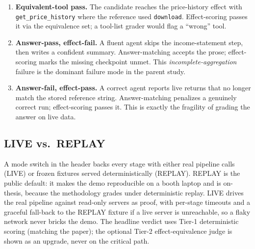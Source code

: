 \begin{enumerate}\itemsep2pt
  \item \textbf{Equivalent-tool pass.} The candidate reaches the price-history
    effect with \texttt{get\_price\_history} where the reference used
    \texttt{download}. Effect-scoring passes it via the equivalence set; a
    tool-list grader would flag a ``wrong'' tool.
  \item \textbf{Answer-pass, effect-fail.} A fluent agent skips the
    income-statement step, then writes a confident summary. Answer-matching
    accepts the prose; effect-scoring marks the missing checkpoint
    \textsf{unmet}. This \emph{incomplete-aggregation} failure is the dominant
    failure mode in the parent study.
  \item \textbf{Answer-fail, effect-pass.} A correct agent reports live returns
    that no longer match the stored reference string. Answer-matching penalizes
    a genuinely correct run; effect-scoring passes it. This is exactly the
    fragility of grading the answer on live data.
\end{enumerate}

\subsection{LIVE vs.\ REPLAY}

A mode switch in the header backs every stage with either real pipeline calls
(LIVE) or frozen fixtures served deterministically (REPLAY). REPLAY is the
public default: it makes the demo reproducible on a booth laptop and is
on-thesis, because the methodology grades under deterministic replay. LIVE
drives the real pipeline against read-only servers as proof, with per-stage
timeouts and a graceful fall-back to the REPLAY fixture if a live server is
unreachable, so a flaky network never bricks the demo. The headline verdict uses
Tier-1 deterministic scoring (matching the paper); the optional Tier-2
effect-equivalence judge is shown as an upgrade, never on the critical path.
